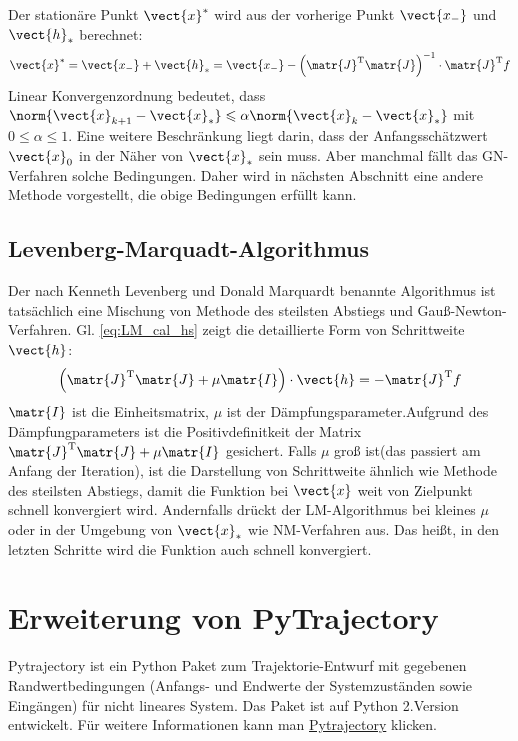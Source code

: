 Der stationäre Punkt $\vect{x}^{\ast}$ wird aus der vorherige Punkt $\vect{x_{-}}$ und $\vect{h}_{\ast}$ berechnet:
\begin{equation}
\vect{x}^{\ast} = \vect{x_{-}} + \vect{h}_{\ast} = \vect{x_{-}} - \left ( \matr{J}^\mathrm{T} \matr{J} \right )^\mathrm{-1} \cdot \matr{J}^\mathrm{T}f\label{eq:newton-xs}
\end{equation} 
Linear Konvergenzordnung bedeutet, dass $\norm{\vect{x}_{k+1} -\vect{x}_{\ast}} \leqslant \alpha \norm{\vect{x}_{k}-\vect{x}_{\ast}}$ mit $0 \leqslant \alpha \leqslant 1$. Eine weitere Beschränkung liegt darin, dass der Anfangsschätzwert $\vect{x}_{0}$ in der Näher von $\vect{x}_{\ast}$ sein muss. Aber manchmal fällt das GN-Verfahren solche Bedingungen. Daher wird in nächsten Abschnitt eine andere Methode vorgestellt, die obige Bedingungen erfüllt kann. 
\subsection{Levenberg-Marquadt-Algorithmus}
\label{Levenberg-Marquadt-Algorithmus}
Der nach Kenneth Levenberg und Donald Marquardt benannte Algorithmus ist tatsächlich eine Mischung von Methode des steilsten Abstiegs und Gauß-Newton-Verfahren. Gl. \ref{eq:LM_cal_hs} zeigt die detaillierte Form von Schrittweite $\vect{h}$\cite{madsen2004methods}\cite{von2015einfuhrung}:
\begin{equation}
\left ( \matr{J}^\mathrm{T} \matr{J} + \mu\matr{I}\right ) \cdot \vect{h}  = -\matr{J}^\mathrm{T}f
\label{eq:LM_cal_hs}
\end{equation}
$\matr{I}$ ist die Einheitsmatrix, $\mu$ ist der Dämpfungsparameter.Aufgrund des Dämpfungparameters ist die Positivdefinitkeit der Matrix $\matr{J}^\mathrm{T} \matr{J} + \mu\matr{I}$ gesichert. Falls $\mu$ groß ist(das passiert am Anfang der Iteration), ist die Darstellung von Schrittweite ähnlich wie Methode des steilsten Abstiegs, damit die Funktion bei $\vect{x}$ weit von Zielpunkt schnell konvergiert wird. Andernfalls drückt der LM-Algorithmus bei kleines $\mu$ oder in der Umgebung von $\vect{x}_{\ast}$ wie NM-Verfahren aus. Das heißt, in den letzten Schritte wird die Funktion auch schnell konvergiert.

\section{Erweiterung von PyTrajectory}
\label{Erweiterung_von_PyTrajectory}
Pytrajectory ist ein Python Paket zum Trajektorie-Entwurf mit gegebenen Randwertbedingungen (Anfangs- und Endwerte der Systemzuständen sowie Eingängen) für nicht lineares System. Das Paket ist auf Python 2.Version entwickelt. Für weitere Informationen kann man \href{https://pytrajectory.readthedocs.io/en/master/guide/about.html}{Pytrajectory} klicken.\\
